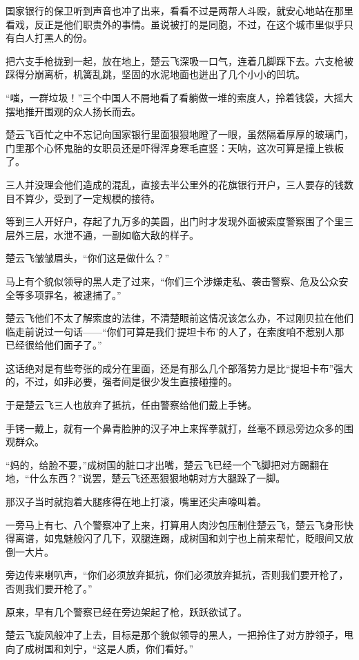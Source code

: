 国家银行的保卫听到声音也冲了出来，看看不过是两帮人斗殴，就安心地站在那里看戏，反正是他们职责外的事情。虽说被打的是同胞，不过，在这个城市里似乎只有白人打黑人的份。

把六支手枪拢到一起，放在地上，楚云飞深吸一口气，连着几脚踩下去。六支枪被踩得分崩离析，机簧乱跳，坚固的水泥地面也迸出了几个小小的凹坑。

“嗤，一群垃圾！”三个中国人不屑地看了看躺做一堆的索度人，拎着钱袋，大摇大摆地推开围观的众人扬长而去。

楚云飞百忙之中不忘记向国家银行里面狠狠地瞪了一眼，虽然隔着厚厚的玻璃门，门里那个心怀鬼胎的女职员还是吓得浑身寒毛直竖：天呐，这次可算是撞上铁板了。

三人并没理会他们造成的混乱，直接去半公里外的花旗银行开户，三人要存的钱数目不算少，受到了一定规模的接待。

等到三人开好户，存起了九万多的美圆，出门时才发现外面被索度警察围了个里三层外三层，水泄不通，一副如临大敌的样子。

楚云飞皱皱眉头，“你们这是做什么？”

马上有个貌似领导的黑人走了过来，“你们三个涉嫌走私、袭击警察、危及公众安全等多项罪名，被逮捕了。”

楚云飞他们不太了解索度的法律，不清楚眼前这情况该怎么办，不过刚贝拉在他们临走前说过一句话——“你们可算是我们‘提坦卡布’的人了，在索度咱不惹别人那已经很给他们面子了。”

这话绝对是有些夸张的成分在里面，还是有那么几个部落势力是比“提坦卡布”强大的，不过，如非必要，强者间是很少发生直接碰撞的。

于是楚云飞三人也放弃了抵抗，任由警察给他们戴上手铐。

手铐一戴上，就有一个鼻青脸肿的汉子冲上来挥拳就打，丝毫不顾忌旁边众多的围观群众。

“妈的，给脸不要，”成树国的脏口才出嘴，楚云飞已经一个飞脚把对方踢翻在地，“什么东西？”说罢，楚云飞还恶狠狠地朝对方大腿跺了一脚。

那汉子当时就抱着大腿疼得在地上打滚，嘴里还尖声嚎叫着。

一旁马上有七、八个警察冲了上来，打算用人肉沙包压制住楚云飞，楚云飞身形快得离谱，如鬼魅般闪了几下，双腿连踢，成树国和刘宁也上前来帮忙，眨眼间又放倒一大片。

旁边传来喇叭声，“你们必须放弃抵抗，你们必须放弃抵抗，否则我们要开枪了，否则我们要开枪了。”

原来，早有几个警察已经在旁边架起了枪，跃跃欲试了。

楚云飞旋风般冲了上去，目标是那个貌似领导的黑人，一把拎住了对方脖领子，甩向了成树国和刘宁，“这是人质，你们看好。”

